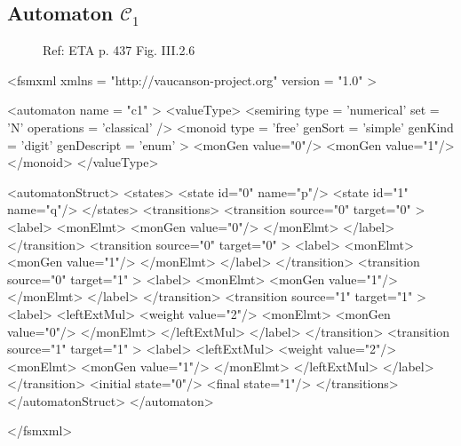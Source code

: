 \subsection{Automaton $\mathcal{C}_1$}
\label{automatonC1}

\begin{figure}[h]
  \begin{minipage}[c]{.66\textwidth}
    Ref: ETA p. 437 Fig. III.2.6
  \end{minipage}
  \begin{minipage}[c]{.34\textwidth}

  \end{minipage}
\end{figure}

{\footnotesize 
\begin{listing}[5]{1}
<fsmxml  xmlns   = "http://vaucanson-project.org" 
         version = "1.0" > 

<automaton name = "c1" >
  <valueType>
    <semiring  type       = 'numerical'
               set        = 'N'
               operations = 'classical' /> 
    <monoid    type       = 'free'
               genSort    = 'simple' 
               genKind    = 'digit' 
               genDescript = 'enum' > 
      <monGen value="0"/>
      <monGen value="1"/>
    </monoid>
  </valueType>
\end{listing}
}

\newpage 

{\footnotesize 
\begin{listingcont}
  <automatonStruct>
    <states>
      <state  id="0"  name="p"/>
      <state  id="1"  name="q"/>
    </states>
    <transitions>
      <transition  source="0"  target="0" >
        <label>
          <monElmt>
            <monGen value="0"/>
          </monElmt>
        </label>
      </transition>
      <transition  source="0"  target="0" >
        <label>
          <monElmt>
            <monGen value="1"/>
          </monElmt>
        </label>
      </transition>
      <transition  source="0"  target="1" >
        <label>
          <monElmt>
            <monGen value="1"/>
          </monElmt>
        </label>
      </transition>
      <transition  source="1"  target="1" >
        <label>
	  <leftExtMul>
            <weight value="2"/>
	    <monElmt>
	      <monGen value="0"/>
	    </monElmt>
	  </leftExtMul>
        </label>
      </transition>
      <transition  source="1"  target="1" >
        <label>
	  <leftExtMul>
            <weight value="2"/>
	    <monElmt>
	      <monGen value="1"/>
	    </monElmt>
	  </leftExtMul>
        </label>
      </transition>
      <initial  state="0"/>
      <final    state="1"/>
    </transitions>
  </automatonStruct>
</automaton>

</fsmxml>
\end{listingcont}
}

